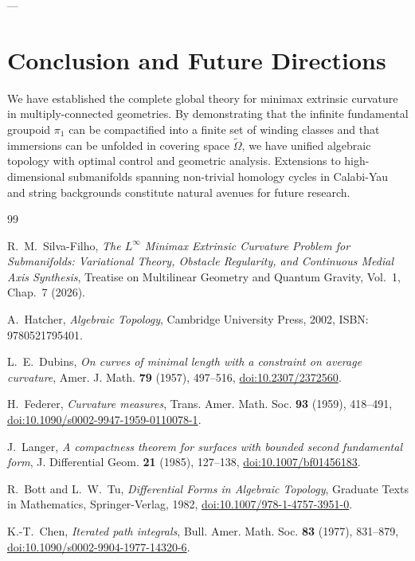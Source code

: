 \documentclass[11pt,reqno]{amsart}
\theoremstyle{definition}
\newcommand{\Cover}{\widetilde{\Omega}}
\numberwithin{equation}{section}
\begin{document}
---

\section{Conclusion and Future Directions}
We have established the complete global theory for minimax extrinsic curvature in multiply-connected geometries. By demonstrating that the infinite fundamental groupoid $\pi_1$ can be compactified into a finite set of winding classes and that immersions can be unfolded in covering space $\Cover$, we have unified algebraic topology with optimal control and geometric analysis. Extensions to high-dimensional submanifolds spanning non-trivial homology cycles in Calabi-Yau and string backgrounds constitute natural avenues for future research.

\begin{thebibliography}{99}

R.~M.~Silva-Filho,
\emph{The $L^\infty$ Minimax Extrinsic Curvature Problem for Submanifolds: Variational Theory, Obstacle Regularity, and Continuous Medial Axis Synthesis},
Treatise on Multilinear Geometry and Quantum Gravity, Vol.~1, Chap.~7 (2026).

A.~Hatcher,
\emph{Algebraic Topology},
Cambridge University Press, 2002, ISBN: 9780521795401.

L.~E.~Dubins,
\emph{On curves of minimal length with a constraint on average curvature},
Amer. J. Math. \textbf{79} (1957), 497--516, \href{https://doi.org/10.2307/2372560}{doi:10.2307/2372560}.

H.~Federer,
\emph{Curvature measures},
Trans. Amer. Math. Soc. \textbf{93} (1959), 418--491, \href{https://doi.org/10.1090/s0002-9947-1959-0110078-1}{doi:10.1090/s0002-9947-1959-0110078-1}.

J.~Langer,
\emph{A compactness theorem for surfaces with bounded second fundamental form},
J. Differential Geom. \textbf{21} (1985), 127--138, \href{https://doi.org/10.1007/bf01456183}{doi:10.1007/bf01456183}.

R.~Bott and L.~W.~Tu,
\emph{Differential Forms in Algebraic Topology},
Graduate Texts in Mathematics, Springer-Verlag, 1982, \href{https://doi.org/10.1007/978-1-4757-3951-0}{doi:10.1007/978-1-4757-3951-0}.

K.-T.~Chen,
\emph{Iterated path integrals},
Bull. Amer. Math. Soc. \textbf{83} (1977), 831--879, \href{https://doi.org/10.1090/s0002-9904-1977-14320-6}{doi:10.1090/s0002-9904-1977-14320-6}.


\end{thebibliography}
\end{document}
